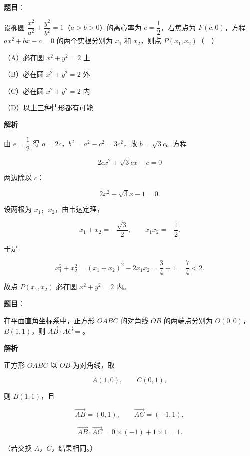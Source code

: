 \begin{answer}

\textbf{题目}：

设椭圆 $\dfrac{x^2}{a^2}+\dfrac{y^2}{b^2}=1$（$a>b>0$）的离心率为 $e=\dfrac12$，右焦点为 $F(c,0)$，方程 $ax^2+bx-c=0$ 的两个实根分别为 $x_1$ 和 $x_2$，则点 $P(x_1,x_2)$（　）

（A）必在圆 $x^2+y^2=2$ 上

（B）必在圆 $x^2+y^2=2$ 外

（C）必在圆 $x^2+y^2=2$ 内

（D）以上三种情形都有可能

\textbf{解析}

由 $e=\dfrac12$ 得 $a=2c$，$b^2=a^2-c^2=3c^2$，故 $b=\sqrt3c$。方程

\nopagebreak[4]
\[2cx^2+\sqrt3cx-c=0\]

两边除以 $c$：

\nopagebreak[4]
\[2x^2+\sqrt3x-1=0.\]

设两根为 $x_1$，$x_2$，由韦达定理，

\nopagebreak[4]
\[x_1+x_2=-\frac{\sqrt3}{2},\qquad x_1x_2=-\frac12.\]

于是

\nopagebreak[4]
\[x_1^2+x_2^2=(x_1+x_2)^2-2x_1x_2=\frac34+1=\frac74<2.\]

故点 $P(x_1,x_2)$ 必在圆 $x^2+y^2=2$ 内。


\end{answer}
\begin{answer}

\textbf{题目}：

在平面直角坐标系中，正方形 $OABC$ 的对角线 $OB$ 的两端点分别为 $O(0,0)$，$B(1,1)$，则 $\overrightarrow{AB}\cdot\overrightarrow{AC}=$\gkblank{}。

\textbf{解析}

正方形 $OABC$ 以 $OB$ 为对角线，取

\nopagebreak[4]
\[A(1,0),\qquad C(0,1),\]

则 $B(1,1)$，且

\nopagebreak[4]
\[\overrightarrow{AB}=(0,1),\qquad \overrightarrow{AC}=(-1,1),\]

\nopagebreak[4]
\[\overrightarrow{AB}\cdot\overrightarrow{AC}=0\times(-1)+1\times1=1.\]

（若交换 $A$，$C$，结果相同。）


\end{answer}
